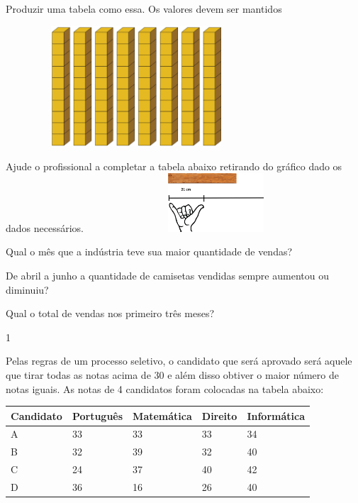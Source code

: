 \begin{escolha}
Produzir uma tabela como essa. Os valores devem ser mantidos

\includegraphics[width=3.82692in,height=1.76423in]{media/image103.png}

\begin{escolha}

\item
  Ajude o profissional a completar a tabela abaixo retirando do gráfico
  dado os dados necessários.
\includegraphics[width=3.78846in,height=0.86073in]{media/image104.png}

\item
  Qual o mês que a indústria teve sua maior quantidade de vendas?

\item
  De abril a junho a quantidade de camisetas vendidas sempre aumentou ou
  diminuiu?

\item
  Qual o total de vendas nos primeiro três meses?
\end{escolha}


\num{1}

Pelas regras de um processo seletivo, o candidato que será aprovado será
aquele que tirar todas as notas acima de 30 e além disso obtiver o maior
número de notas iguais. As notas de 4 candidatos foram colocadas na
tabela abaixo:

\begin{longtable}[]{@{}lllll@{}}
\toprule
Candidato & Português & Matemática & Direito &
Informática\tabularnewline
\midrule
\endhead
A & 33 & 33 & 33 & 34\tabularnewline
B & 32 & 39 & 32 & 40\tabularnewline
C & 24 & 37 & 40 & 42\tabularnewline
D & 36 & 16 & 26 & 40\tabularnewline
\bottomrule
\end{longtable}


\end{escolha}

